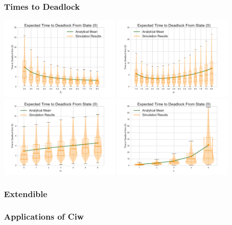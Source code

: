 \documentclass[xcolor={table}]{beamer}
\begin{document}
\begin{frame}
    \frametitle{Times to Deadlock}
    \centering
    \includegraphics[width=0.45\textwidth]{../images/varyL_1Nms}
    \includegraphics[width=0.45\textwidth]{../images/varymu_1Nms}\newline
    \includegraphics[width=0.45\textwidth]{../images/varyn_1Nms}
    \includegraphics[width=0.45\textwidth]{../images/varyc_1Nms}
\end{frame}

\begin{frame}
\frametitle{Extendible}
\end{frame}

\begin{frame}
\begin{center}

\end{center}
\end{frame}

\begin{frame}
\begin{center}

\end{center}
\end{frame}

\begin{frame}
\frametitle{Applications of Ciw}
\begin{center}

\end{center}
\end{frame}

\frame{\titlepage}
\end{document}
